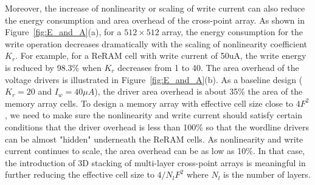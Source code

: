 Moreover, the increase of nonlinearity or scaling of write current can
also reduce the energy consumption and area overhead of the cross-point
array. As shown in Figure~\ref{fig:E_and_A}(a), for a $512 \times 512$
array, the energy consumption for the write operation decreases
dramatically with the scaling of nonlinearity coefficient $K_r$. For
example, for a ReRAM cell with write current of 50uA, the write energy is
reduced by 98.3\% when $K_r$ decreases from 1 to 40. The area overhead of
the voltage drivers is illustrated in Figure~\ref{fig:E_and_A}(b). As a
baseline design ($K_r=20$ and $I_w=40\mu A$), the driver area overhead is
about 35\% the area of the memory array cells. To design a memory array
with effective cell size close to $4F^2$, we need to make sure the
nonlinearity and write current should satisfy certain conditions that the
driver overhead is less than 100\% so that the wordline drivers can be
almost "hidden" underneath the ReRAM cells. As nonlinearity and write
current continues to scale, the area overhead can be as low as 10\%. In
that case, the introduction of 3D stacking of multi-layer cross-point
arrays is meaningful in further reducing the effective cell size to $4/N_l
F^2$ where $N_l$ is the number of layers.



